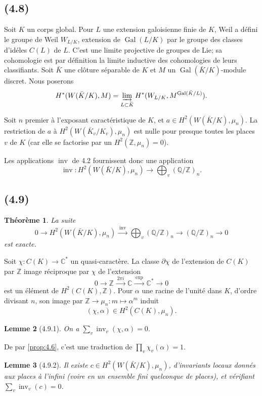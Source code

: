 \documentclass[11pt]{amsart}
\theoremstyle{plain}
\newtheorem{theoreme}{Th\'eor\`eme}[section]
\newtheorem{lemme}[theoreme]{Lemme}
\theoremstyle{definition}
\DeclareMathOperator{\Gal}{Gal}
\DeclareMathOperator{\inv}{inv}
\newcommand{\C}{\mathbb{C}}
\newcommand{\Z}{\mathbb{Z}}
\newcommand{\Q}{\mathbb{Q}}
\begin{document}
\subsection{(4.8)}
Soit $K$ un corps global. Pour $L$ une extension galoisienne finie de $K$, Weil a d\'efini le groupe de Weil $W_{L/K}$, extension de $\Gal(L/K)$ par le groupe des classes d'id\'eles $C(L)$ de $L$. C'est une limite projective de groupes de Lie; sa cohomologie est par d\'efinition la limite inductive des cohomologies de leurs classifiants. Soit $\bar K$ une cl\^oture s\'eparable de $K$ et $M$ un $\Gal(\bar K/K)$-module discret. Nous poserons
\[
H^*(W(\bar K/K),M)=\varinjlim_{L\subset\bar K}H^*(W_{L/K},M^{\Gal(\bar K/L)}).
\]

Soit $n$ premier \`a l'exposant caract\'eristique de $K$, et $a\in H^2(W(\bar K/K),\mu_n)$. La restriction de $a$ \`a $H^2(W(\bar K_v/K_v),\mu_n)$ est nulle pour presque toutes les places $v$ de $K$ (car elle se factorise par un $H^2(\Z,\mu_n)=0$).

Les applications $\inv$ de 4.2 fournissent donc une application
\[
\inv\colon H^2(W(\bar K/K),\mu_n)\longrightarrow\bigoplus_v(\Q/\Z)_n.
\]

\subsection{(4.9)}
\begin{theoreme}\label{thm:4.9}
La suite
\[
0\longrightarrow H^2(W(\bar K/K),\mu_n)\xrightarrow{\;\inv\;}\bigoplus_v(\Q/\Z)_n\longrightarrow(\Q/\Z)_n\longrightarrow 0
\]
est exacte.
\end{theoreme}

Soit $\chi\colon C(K)\to\C^*$ un quasi-caract\`ere. La classe $\partial\chi$ de l'extension de $C(K)$ par $\Z$ image r\'eciproque par $\chi$ de l'extension
\[
0\longrightarrow\Z\xrightarrow{\;2\pi i\;}\C\xrightarrow{\;\exp\;}\C^*\longrightarrow 0
\]
est un \'el\'ement de $H^2(C(K),\Z)$. Pour $\alpha$ une racine de l'unit\'e dans $K$, d'ordre divisant $n$, son image par $\Z\to\mu_n\colon m\mapsto\alpha^m$ induit
\[
(\chi,\alpha)\in H^2(C(K),\mu_n).
\]

\begin{lemme}[4.9.1]\label{lem:4.9.1}
On a $\sum_v\inv_v(\chi,\alpha)=0$.
\end{lemme}

De par \ref{prop:4.6}, c'est une traduction de $\prod_v\chi_v(\alpha)=1$.

\begin{lemme}[4.9.2]\label{lem:4.9.2}
Il existe $c\in H^2(W(\bar K/K),\mu_n)$, d'invariants locaux donn\'es aux places \`a l'infini (voire en un ensemble fini quelconque de places), et v\'erifiant $\sum_v\inv_v(c)=0$.
\end{lemme}
\end{document}
